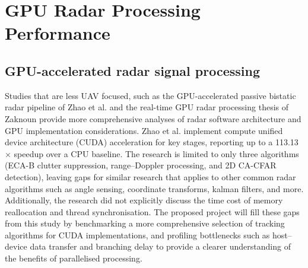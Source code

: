\section{GPU Radar Processing Performance}
\subsection{GPU-accelerated radar signal processing}
Studies that are less UAV focused, such as the GPU-accelerated passive bistatic radar pipeline of Zhao et al. \cite{rs15225421} and the real-time GPU radar processing thesis of Zaknoun \cite{zaknoun2024_realtime_gpu_accelerated_radar_processing} provide more comprehensive analyses of radar software architecture and GPU implementation considerations. Zhao et al. implement compute unified device architecture (CUDA) acceleration for key stages, reporting up to a 113.13$\times$ speedup over a CPU baseline. The research is limited to only three algorithms (ECA-B clutter suppression, range–Doppler processing, and 2D CA-CFAR detection), leaving gaps for similar research that applies to other common radar algorithms such as angle sensing, coordinate transforms, kalman filters, and more. Additionally, the research did not explicitly discuss the time cost of memory reallocation and thread synchronisation. The proposed project will fill these gaps from this study by benchmarking a more comprehensive selection of tracking algorithms for CUDA implementations, and profiling bottlenecks such as host–device data transfer and branching delay to provide a clearer understanding of the benefits of parallelised processing. 
